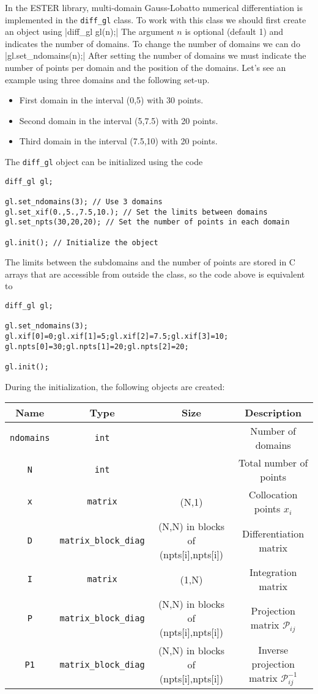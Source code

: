 In the ESTER library, multi-domain Gauss-Lobatto numerical differentiation is implemented in the
\verb|diff_gl| class. To work with this class we should first create an object using
|diff_gl gl(n);|
The argument $n$ is optional (default 1) and indicates the number of domains. To change the number
of domains we can do
|gl.set_ndomains(n);|
After setting the number of domains we must indicate the number of points per domain and the position
of the domains. Let's see an example using three domains and the following set-up.
\begin{itemize}
\item First domain in the interval (0,5) with 30 points.
\item Second domain in the interval (5,7.5) with 20 points.
\item Third domain in the interval (7.5,10) with 20 points.
\end{itemize}
The \verb|diff_gl| object can be initialized using the code
\begin{verbatim}
diff_gl gl;

gl.set_ndomains(3); // Use 3 domains
gl.set_xif(0.,5.,7.5,10.); // Set the limits between domains
gl.set_npts(30,20,20); // Set the number of points in each domain

gl.init(); // Initialize the object

\end{verbatim}

The limits between the subdomains and the number of points are stored in C arrays that are accessible 
from outside the class, so the code above is equivalent to

\begin{verbatim}
diff_gl gl;

gl.set_ndomains(3);
gl.xif[0]=0;gl.xif[1]=5;gl.xif[2]=7.5;gl.xif[3]=10;
gl.npts[0]=30;gl.npts[1]=20;gl.npts[2]=20;

gl.init(); 

\end{verbatim}

During the initialization, the following objects are created:

\medskip
\begin{tabular}{cccc}
Name&Type&Size&Description\\
\hline
\texttt{ndomains}&\texttt{int}&&Number of domains\\
\texttt{N}&\texttt{int}&&Total number of points\\
\texttt{x}&\texttt{matrix}&(N,1)& Collocation points $x_i$\\
\texttt{D}&\texttt{matrix\_block\_diag}&
(N,N) in blocks of (npts[i],npts[i])&Differentiation matrix\\
\texttt{I}&\texttt{matrix}&(1,N)&Integration matrix\\
\texttt{P}&\texttt{matrix\_block\_diag}&
(N,N) in blocks of (npts[i],npts[i])&Projection matrix $\mathcal{P}_{ij}$\\
\texttt{P1}&\texttt{matrix\_block\_diag}&
(N,N) in blocks of (npts[i],npts[i])&Inverse projection matrix $\mathcal{P}^{-1}_{ij}$\\
\end{tabular}
\medskip

